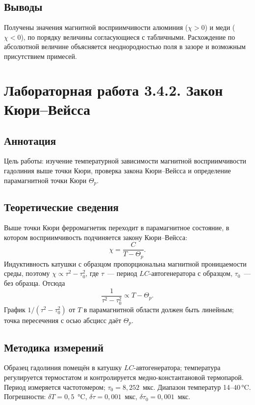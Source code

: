 \documentclass[a4paper,12pt]{article}
\begin{document}
	\subsection{Выводы}
	Получены значения магнитной восприимчивости алюминия ($\chi > 0$) и меди ($\chi < 0$), по порядку величины согласующиеся с табличными. Расхождение по абсолютной величине объясняется неоднородностью поля в зазоре и возможным присутствием примесей.
	
	\newpage
	
	\section{Лабораторная работа 3.4.2. Закон Кюри--Вейсса}
	
	\subsection{Аннотация}
	Цель работы: изучение температурной зависимости магнитной восприимчивости гадолиния выше точки Кюри, проверка закона Кюри--Вейсса и определение парамагнитной точки Кюри $\Theta_p$.
	
	\subsection{Теоретические сведения}
	Выше точки Кюри ферромагнетик переходит в парамагнитное состояние, в котором восприимчивость подчиняется закону Кюри--Вейсса:
	\begin{equation}
		\chi = \frac{C}{T - \Theta_p}.
	\end{equation}
	Индуктивность катушки с образцом пропорциональна магнитной проницаемости среды, поэтому $\chi \propto \tau^2 - \tau_0^2$, где $\tau$~--- период $LC$-автогенератора с образцом, $\tau_0$~--- без образца. Отсюда
	\begin{equation}
		\frac{1}{\tau^2 - \tau_0^2} \propto T - \Theta_p.
	\end{equation}
	График $1/(\tau^2-\tau_0^2)$ от $T$ в парамагнитной области должен быть линейным; точка пересечения с осью абсцисс даёт $\Theta_p$.
	
	\subsection{Методика измерений}
	Образец гадолиния помещён в катушку $LC$-автогенератора; температура регулируется термостатом и контролируется медно-константановой термопарой. Период измеряется частотомером; $\tau_0 = 8{,}252$~мкс. Диапазон температур 14--40\,°C. Погрешности: $\delta T = 0{,}5$~°C, $\delta\tau = 0{,}001$~мкс, $\delta\tau_0 = 0{,}001$~мкс.
	
\end{document}
